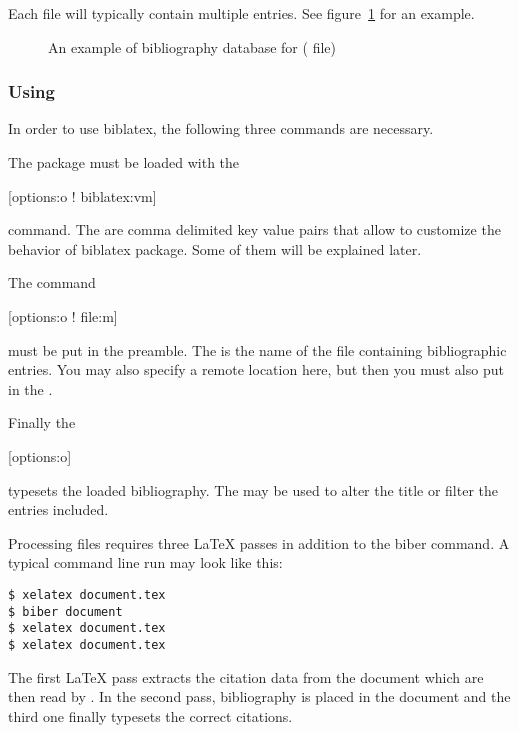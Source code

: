 Each  file will typically contain multiple entries. See
figure~\ref{fig:bibfile} for an example.

\begin{figure}[ht]
  \begin{lined}{\textwidth}
    
  \end{lined}
  \caption[An example of bibliography database]{An example of bibliography
  database for  ( file)} \label{fig:bibfile}
\end{figure}

\subsubsection{Using }

In order to use biblatex, the following three commands are necessary.

The  package must be loaded with the
\begin{lscommand}
  [options:o ! biblatex:vm]
\end{lscommand}
command. The  are comma delimited key value pairs that allow to
customize the behavior of biblatex package. Some of them will be explained
later.

The command
\begin{lscommand}
  [options:o ! file:m]
\end{lscommand}
must be put in the preamble. The  is the name of the  file
containing bibliographic entries. You may also specify a remote location here,
but then you must also put  in the .

Finally the
\begin{lscommand}
  [options:o]
\end{lscommand}
typesets the loaded bibliography. The  may be used to alter the
title or filter the entries included.

Processing files requires three \LaTeX{} passes in addition to the biber
command. A typical command line run may look like this:
\begin{code}
\begin{verbatim}
$ xelatex document.tex
$ biber document
$ xelatex document.tex
$ xelatex document.tex
\end{verbatim}
\end{code}
The first \LaTeX{} pass extracts the citation data from the document which are
then read by . In the second pass, bibliography is placed in the
document and the third one finally typesets the correct citations.

